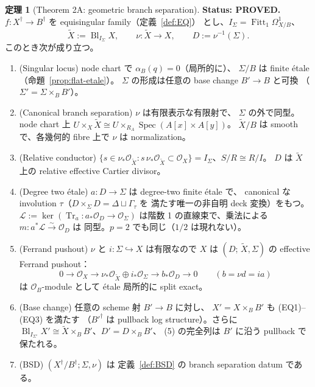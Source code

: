 \documentclass[11pt,a4paper]{article}
\numberwithin{equation}{section}
\theoremstyle{definition}
\newtheorem{theorem}[definition]{定理}
\DeclareMathOperator{\Tr}{Tr}
\DeclareMathOperator{\Fitt}{Fitt}
\DeclareMathOperator{\Bl}{Bl}
\newcommand{\OO}{\mathcal O}
\newcommand{\tX}{\widetilde X}
\newcommand{\LL}{\mathcal L}
\begin{document}
\begin{theorem}[Theorem 2A: geometric branch separation]\label{thm:2A}
\textbf{Status: PROVED.}
\(f:X^\dagger\to B^\dagger\) を equisingular family（定義~\ref{def:EQ}）
とし、\(I_\Sigma=\Fitt_1\Omega^1_{X/B}\)、
\[
  \tX:=\Bl_{I_\Sigma}X,\qquad \nu:\tX\to X,\qquad D:=\nu^{-1}(\Sigma).
\]
このとき次が成り立つ。
\begin{enumerate}[label=(\arabic*)]
\item (Singular locus) node chart で \(\alpha_B(q)=0\)（局所的に）、
  \(\Sigma/B\) は finite étale（命題~\ref{prop:flat-etale}）。
  \(\Sigma\) の形成は任意の base change \(B'\to B\) と可換
  （\(\Sigma'=\Sigma\times_BB'\)）。
\item (Canonical branch separation) \(\nu\) は有限表示な有限射で、
  \(\Sigma\) の外で同型。node chart 上
  \(U\times_X\tX\cong U\times_{R_A}\operatorname{Spec}(A[x]\times A[y])\)。
  \(\tX/B\) は smooth で、各幾何的 fibre 上で \(\nu\) は normalization。
\item (Relative conductor) \(\{s\in\nu_*\OO_{\tX}:s\,\nu_*\OO_{\tX}\subset\OO_X\}
  =I_\Sigma\)、\(S/R\cong R/I\)。
  \(D\) は \(\tX\) 上の relative effective Cartier divisor。
\item (Degree two étale) \(a:D\to\Sigma\) は degree-two finite étale で、
  canonical な involution \(\tau\)（$D\times_\Sigma D=\Delta\sqcup\Gamma_\tau$ を
  満たす唯一の非自明 deck 変換）をもつ。\(\LL:=\ker(\Tr_a:a_*\OO_D\to\OO_\Sigma)\)
  は階数 1 の直線束で、乗法による \(m:a^*\LL\xrightarrow{\sim}\OO_D\) は
  同型。\(p=2\) でも同じ（$1/2$ は現れない）。
\item (Ferrand pushout) \(\nu\) と \(i:\Sigma\hookrightarrow X\) は有限なので
  $X$ は $(D;\,\tX,\Sigma)$ の effective Ferrand pushout：
  \[
    0\to\OO_X\to\nu_*\OO_{\tX}\oplus i_*\OO_\Sigma\to b_*\OO_D\to0
    \qquad(b=\nu d=ia)
  \]
  は $\OO_B$-module として étale 局所的に split exact。
\item (Base change) 任意の scheme 射 \(B'\to B\) に対し、
  \(X'=X\times_BB'\) も (EQ1)--(EQ3) を満たす
  （$B'^\dagger$ は pullback log structure）。さらに
  \(\Bl_{I_{\Sigma'}}X'\cong\tX\times_BB'\)、$D'=D\times_BB'$、
  (5) の完全列は $B'$ に沿う pullback で保たれる。
\item (BSD) \((X^\dagger/B^\dagger;\Sigma,\nu)\) は
  定義~\ref{def:BSD} の branch separation datum である。
\end{enumerate}
\end{theorem}
\end{document}
